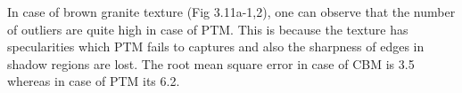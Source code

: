 In case of brown granite texture (Fig 3.11a-1,2), one can observe that the number
of outliers are quite high in case of PTM. This is because the texture has
specularities which PTM fails to captures and also the sharpness of edges in
shadow regions are lost. The root mean square error in case of CBM is 3.5 whereas in case of PTM its 6.2. 
\begin{figure}[t]
\centering
{}


\end{figure}
